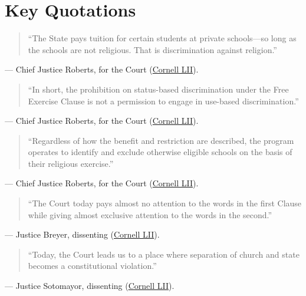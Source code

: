 \documentclass[12pt]{article}
\begin{document}
\section{Key Quotations}

\begin{quote}
``The State pays tuition for certain students at private schools---so long as the schools are not religious. That is discrimination against religion.''
\end{quote}
\noindent --- Chief Justice Roberts, for the Court (\href{https://www.law.cornell.edu/supremecourt/text/20-1088}{Cornell LII}).

\begin{quote}
``In short, the prohibition on status-based discrimination under the Free Exercise Clause is not a permission to engage in use-based discrimination.''
\end{quote}
\noindent --- Chief Justice Roberts, for the Court (\href{https://www.law.cornell.edu/supremecourt/text/20-1088}{Cornell LII}).

\begin{quote}
``Regardless of how the benefit and restriction are described, the program operates to identify and exclude otherwise eligible schools on the basis of their religious exercise.''
\end{quote}
\noindent --- Chief Justice Roberts, for the Court (\href{https://www.law.cornell.edu/supremecourt/text/20-1088}{Cornell LII}).

\begin{quote}
``The Court today pays almost no attention to the words in the first Clause while giving almost exclusive attention to the words in the second.''
\end{quote}
\noindent --- Justice Breyer, dissenting (\href{https://www.law.cornell.edu/supremecourt/text/20-1088}{Cornell LII}).

\begin{quote}
``Today, the Court leads us to a place where separation of church and state becomes a constitutional violation.''
\end{quote}
\noindent --- Justice Sotomayor, dissenting (\href{https://www.law.cornell.edu/supremecourt/text/20-1088}{Cornell LII}).
\end{document}
